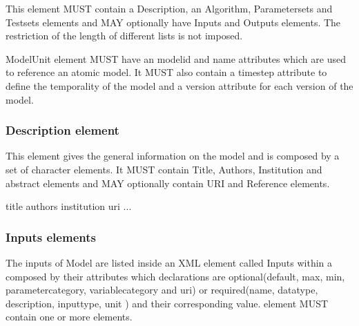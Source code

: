 \documentclass[letterpaper,10pt,english]{sphinxmanual}
\begin{document}
\begin{DUlineblock}{0em}
\item[] This element MUST contain a Description, an Algorithm, Parametersets and Testsets elements and
MAY optionally have Inputs and Outputs elements. The restriction of the length of different lists is not imposed.
\item[] ModelUnit element MUST have an modelid and name attributes which are used to reference an atomic model. It MUST also contain a timestep attribute to define the temporality of the model and
a version attribute for each version of the model.
\end{DUlineblock}


\subsubsection{Description element}
\label{\detokenize{user/description:description-element}}
This element gives the general information on the model and is composed by a set of character elements. It MUST contain
Title, Authors, Institution and abstract elements and MAY optionally contain URI and Reference elements.

%
\begin{sphinxVerbatim}[commandchars=\\\{\}]
    
                title
                authors
                institution
                uri
        ...
\end{sphinxVerbatim}


\subsubsection{Inputs elements}
\label{\detokenize{user/description:inputs-elements}}
The inputs of Model are listed inside an XML element called Inputs within a 
composed by their attributes which declarations are optional(default, max, min, parametercategory, variablecategory and uri) or required(name, datatype, description, inputtype,
unit ) and their corresponding value.  element MUST contain one or more  elements.
\end{document}
